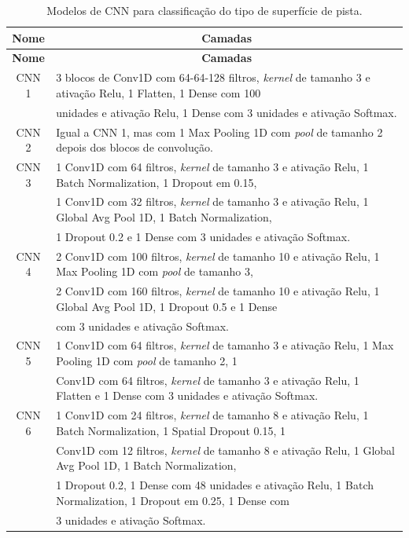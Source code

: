\begin{center}
\scriptsize
\begin{longtable}{cl}
\caption{Modelos de CNN para classificação do tipo de superfície de pista.} 
\label{table:cnn_superficie_pista_1}  \\
\toprule \textbf{Nome} & \multicolumn{1}{c}{\textbf{Camadas}} \\ \midrule
\endfirsthead
\toprule \textbf{Nome} & \multicolumn{1}{c}{\textbf{Camadas}} \\ \midrule
\endhead \endfoot \endlastfoot
CNN 1 &
3 blocos de Conv1D com 64-64-128 filtros, \textit{kernel} de tamanho 3 e ativação Relu, 1 Flatten, 1 Dense com 100 \\ & unidades e ativação Relu, 1 Dense com 3 unidades e ativação Softmax. \\ \midrule
CNN 2 & Igual a CNN 1, mas com 1 Max Pooling 1D com \textit{pool} de tamanho 2 depois dos blocos de convolução. \\ \midrule
CNN 3 & 1 Conv1D com 64 filtros,  \textit{kernel} de tamanho 3 e ativação Relu, 1 Batch Normalization, 1 Dropout em 0.15, \\ & 1 Conv1D com 32 filtros, \textit{kernel} de tamanho 3 e ativação Relu, 1 Global Avg Pool 1D, 1 Batch Normalization, \\ & 1 Dropout 0.2 e 1 Dense com 3 unidades e ativação Softmax.
 \\ \midrule
CNN 4 & 2 Conv1D com 100 filtros, \textit{kernel} de tamanho 10 e ativação Relu, 1 Max Pooling 1D com \textit{pool} de tamanho 3, \\ & 2 Conv1D com 160 filtros, \textit{kernel} de tamanho 10 e ativação Relu, 1 Global Avg Pool 1D, 1 Dropout 0.5 e 1 Dense \\ & com 3 unidades e ativação Softmax.
 \\ \midrule
CNN 5 & 1 Conv1D com 64 filtros, \textit{kernel} de tamanho 3 e ativação Relu, 1 Max Pooling 1D com \textit{pool} de tamanho 2, 1 \\ & Conv1D com 64 filtros, \textit{kernel} de tamanho 3 e ativação Relu, 1 Flatten e 1 Dense com 3 unidades e ativação Softmax.
 \\ \midrule
CNN 6 & 1 Conv1D com 24 filtros, \textit{kernel} de tamanho 8 e ativação Relu, 1 Batch Normalization, 1 Spatial Dropout 0.15, 1 \\ & Conv1D com 12 filtros, \textit{kernel} de tamanho 8 e ativação Relu, 1 Global Avg Pool 1D, 1 Batch Normalization, \\ & 1 Dropout 0.2, 1 Dense com 48 unidades e ativação Relu, 1 Batch Normalization, 1 Dropout em 0.25, 1 Dense com \\ & 3 unidades e ativação Softmax. \\ \midrule

\end{longtable}
\end{center}
